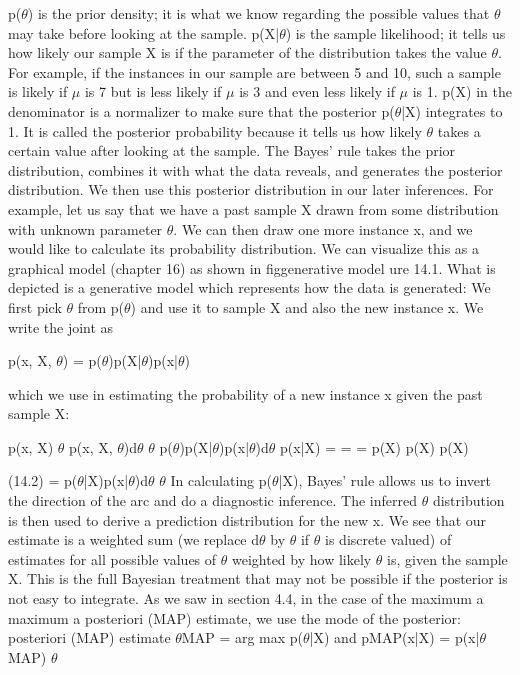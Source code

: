 p($\theta$) is the prior density; it is what we know regarding the possible values that $\theta$ may take before looking at the sample. p(X|$\theta$) is the sample likelihood; it tells us how likely our sample X is if the parameter of the distribution takes the value $\theta$. For example, if the instances in our sample are between 5 and 10, such a sample is likely if $\mu$ is 7 but is less likely if $\mu$ is 3 and even less likely if $\mu$ is 1. p(X) in the denominator is a normalizer to make sure that the posterior p($\theta$|X) integrates to 1. It is called the posterior probability because it tells us how likely $\theta$ takes a certain value after looking at the sample. The Bayes’ rule takes the prior distribution, combines it with what the data reveals, and generates the posterior distribution. We then use this posterior distribution in our later inferences. For example, let us say that we have a past sample X drawn from some distribution with unknown parameter $\theta$. We can then draw one more instance x, and we would like to calculate its probability distribution. We can visualize this as a graphical model (chapter 16) as shown in figgenerative model ure 14.1. What is depicted is a generative model which represents how the data is generated: We first pick $\theta$ from p($\theta$) and use it to sample X and also the new instance x. We write the joint as

p(x, X, $\theta$) = p($\theta$)p(X|$\theta$)p(x|$\theta$)

which we use in estimating the probability of a new instance x given the past sample X:

p(x, X) $\theta$ p(x, X, $\theta$)d$\theta$ $\theta$ p($\theta$)p(X|$\theta$)p(x|$\theta$)d$\theta$ p(x|X) = = = p(X) p(X) p(X)

(14.2) = p($\theta$|X)p(x|$\theta$)d$\theta$ $\theta$ In calculating p($\theta$|X), Bayes’ rule allows us to invert the direction of the arc and do a diagnostic inference. The inferred $\theta$ distribution is then used to derive a prediction distribution for the new x. We see that our estimate is a weighted sum (we replace d$\theta$ by $\theta$ if $\theta$ is discrete valued) of estimates for all possible values of $\theta$ weighted by how likely $\theta$ is, given the sample X. This is the full Bayesian treatment that may not be possible if the posterior is not easy to integrate. As we saw in section 4.4, in the case of the maximum a maximum a posteriori (MAP) estimate, we use the mode of the posterior: posteriori (MAP) estimate $\theta$MAP = arg max p($\theta$|X) and pMAP(x|X) = p(x|$\theta$MAP) $\theta$

